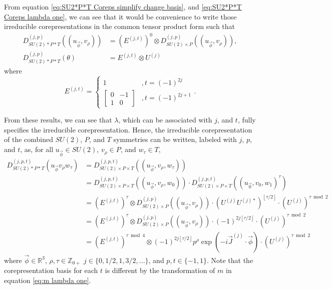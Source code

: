\documentclass[preprint, 12pt]{revtex4-2}
\numberwithin{equation}{section}
\begin{document}
From equation \ref{eq:SU2*P*T Coreps simplify change basis}, and \ref{eq:SU2*P*T Coreps lambda one}, we can see that it would be convenience to write those irreducible corepresentations in the common tensor product form such that
\begin{equation}\label{eq:SU2*P*T Coreps generalized}
    \begin{aligned}
        D_{SU(2)\ast P\ast T}^{(j,p)}((u_{\vec{\phi}}, v_\rho))
        &= \left(E^{(j,t)}\right)^0\otimes D_{SU(2)\times P}^{(j,p)}((u_{\vec{\phi}}, v_\rho)), \\
        D_{SU(2)\ast P\ast T}^{(j,p)}(\theta) 
        &= E^{(j,t)}\otimes U^{(j)}
    \end{aligned}
\end{equation}
where
\begin{equation}\label{eq:E}
    E^{(j,t)} = \begin{cases}
        1 &, t = (-1)^{2j} \\
        \begin{bmatrix}0&-1\\1&0\end{bmatrix} &, t = (-1)^{2j+1}
    \end{cases}.
\end{equation}

From these results, we can see that $\lambda$, which can be associated with $j$, and $t$, fully specifies the irreducible corepresentation. Hence, the irreducible corepresentation of the combined $SU(2)$, $P$, and $T$ symmetries can be written, labeled with $j$, $p$, and $t$, as, for all $u_{\vec{\phi}}\in SU(2)$, $v_\rho \in P$, and $w_\tau \in T$,
\begin{equation}\label{eq:SU2*P*T IrCoreps}
    \begin{aligned}
        D^{(j,p,t)}_{SU(2)\ast P\ast T}(u_{\vec{\phi}} v_\rho w_\tau) &= D^{(j,p,t)}_{SU(2)\times P\times T}((u_{\vec{\phi}},v_\rho,w_\tau)) \\
        &= D^{(j,p,t)}_{SU(2)\times P\times T}((u_{\vec{\phi}},v_\rho,w_0))\cdot D^{(j,p,t)}_{SU(2)\times P\times T}((u_{\vec{0}},v_0,w_1)^\tau) \\
        &= \left(E^{(j,t)}\right)^\tau\otimes D_{SU(2)\times P}^{(j,p)}((u_{\vec{\phi}}, v_\rho))\cdot\left(U^{(j)}U^{(j)\ast}\right)^{\left\lfloor \tau/2\right\rfloor}\cdot\left(U^{(j)}\right)^{\tau\bmod 2} \\
        &= \left(E^{(j,t)}\right)^\tau\otimes D_{SU(2)\times P}^{(j,p)}((u_{\vec{\phi}}, v_\rho))\cdot(-1)^{2j\left\lfloor \tau/2\right\rfloor}\cdot\left(U^{(j)}\right)^{\tau\bmod 2} \\
        &= \left(E^{(j,t)}\right)^{\tau\bmod 4}\otimes(-1)^{2j\left\lfloor \tau/2\right\rfloor}p^\rho\exp(-i\vec{J}^{(j)}\cdot\vec{\phi})\cdot \left(U^{(j)}\right)^{\tau\bmod 2}
    \end{aligned}
\end{equation}
where $\vec{\phi}\in\mathbb{R}^3$, $\rho,\tau\in\mathbb{Z}_{0+}$ $j\in\{0, 1/2, 1, 3/2, ...\}$, and $p, t\in\{-1, 1\}$. Note that the corepresentation basis for each $t$ is different by the transformation of $m$ in equation \ref{eq:m lambda one}.
\end{document}
